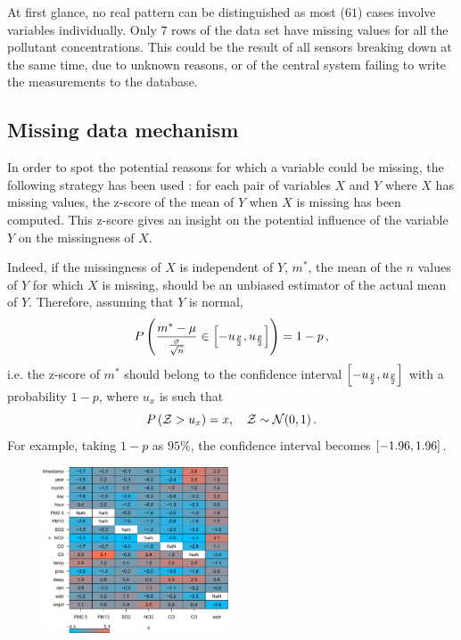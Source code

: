 \documentclass[a4paper, 12pt]{article}
\begin{document}
    At first glance, no real pattern can be distinguished as most ($61$) cases involve variables individually. Only $7$ rows of the data set have missing values for all the pollutant concentrations. This could be the result of all sensors breaking down at the same time, due to unknown reasons, or of the central system failing to write the measurements to the database.
    \subsection{Missing data mechanism}
	In order to spot the potential reasons for which a variable could be missing, the following strategy has been used : for each pair of variables $X$ and $Y$ where $X$ has missing values, the z-score of the mean of $Y$ when $X$ is missing has been computed. This z-score gives an insight on the potential influence of the variable $Y$ on the missingness of $X$. \par
	Indeed, if the missingness of $X$ is independent of $Y$, $m^*$, the mean of the $n$ values of $Y$ for which $X$ is missing, should be an unbiased estimator of the actual mean of $Y$. Therefore, assuming that $Y$ is normal,
	\begin{equation*}
	    P\left(\frac{m^* - \mu}{\frac{\sigma}{\sqrt{n}}} \in \left[- u_{\frac{p}{2}}, u_{\frac{p}{2}}\right]\right) = 1 - p \, ,
	\end{equation*}
	i.e. the z-score of $m^*$ should belong to the confidence interval $\left[- u_{\frac{p}{2}}, u_{\frac{p}{2}} \right]$ with a probability $1 - p$, where $u_{x}$ is such that
	\begin{equation*}
	    P\left(\mathcal{Z} > u_{x}\right) = x, \quad \mathcal{Z} \sim \mathcal{N}(0, 1) \, .
	\end{equation*}
	For example, taking $1 - p$ as $95 \%$, the confidence interval becomes $\left[- \num{1.96}, \num{1.96} \right]$. \par
	\begin{figure}
	    \vspace{-1em}
	    \centering
	    \includegraphics[width=0.49\textwidth]{resources/pdf/zs_mean_NA.pdf}
	    \label{fig:z-scores}
	    \vspace{-2em}
	\end{figure}
\end{document}
